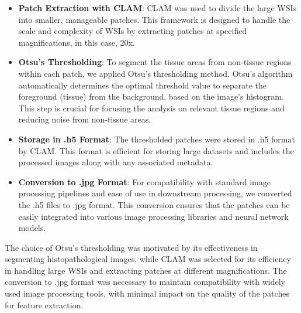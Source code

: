 \documentclass[10pt,twocolumn]{article}
\begin{document}
\begin{itemize}
    \item \textbf{Patch Extraction with CLAM}: CLAM was used to divide the large WSIs into smaller, manageable patches. This framework is designed to handle the scale and complexity of WSIs by extracting patches at specified magnifications, in this case, 20x.

    \item \textbf{Otsu's Thresholding}: To segment the tissue areas from non-tissue regions within each patch, we applied Otsu's thresholding method. Otsu's algorithm automatically determines the optimal threshold value to separate the foreground (tissue) from the background, based on the image's histogram. This step is crucial for focusing the analysis on relevant tissue regions and reducing noise from non-tissue areas.

    \item \textbf{Storage in .h5 Format}: The thresholded patches were stored in .h5 format by CLAM. This format is efficient for storing large datasets and includes the processed images along with any associated metadata.

    \item \textbf{Conversion to .jpg Format}: For compatibility with standard image processing pipelines and ease of use in downstream processing, we converted the .h5 files to .jpg format. This conversion ensures that the patches can be easily integrated into various image processing libraries and neural network models.
\end{itemize}

The choice of Otsu's thresholding was motivated by its effectiveness in segmenting histopathological images, while CLAM was selected for its efficiency in handling large WSIs and extracting patches at different magnifications. The conversion to .jpg format was necessary to maintain compatibility with widely used image processing tools, with minimal impact on the quality of the patches for feature extraction.
\end{document}
